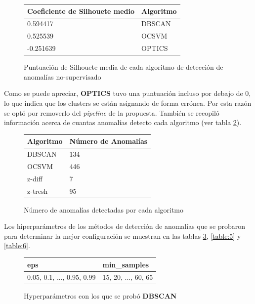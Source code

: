 		\begin{figure}[htb]
			\centering
			\begin{tabular}{ll}
			\toprule
			   Coeficiente de Silhouete medio & Algoritmo \\
			\midrule
			   0.594417 &    DBSCAN \\
			   0.525539 &     OCSVM \\
			  -0.251639 &    OPTICS \\
			\bottomrule
			\end{tabular}
			\caption{Puntuación de Silhouete media de cada algoritmo de detección de anomalías no-supervisado}
			\label{table:2}
		\end{figure}

		Como se puede apreciar, \textbf{OPTICS} tuvo una puntuación incluso por debajo de 0, lo que indica que los clusters se están asignando de 
		forma errónea. Por esta razón se optó por removerlo del \emph{pipeline} de la propuesta. También se recopiló información acerca de cuantas 
		anomalías detecto cada algoritmo (ver tabla \ref{table:3}).
    
		\begin{figure}[htb]
			\centering
			\begin{tabular}{ll}
				\toprule
				Algoritmo &  Número de Anomalías \\
				\midrule
				    DBSCAN &                  134 \\
				     OCSVM &                  446 \\
				    z-diff &                    7 \\
				   z-tresh &                   95 \\
				\bottomrule
			\end{tabular}
			\caption{Número de anomalías detectadas por cada algoritmo}
			\label{table:3}
		\end{figure}

		Los hiperparámetros de los métodos de detección de anomalías que se probaron para determinar la mejor configuración se muestran en las tablas 
		\ref{table:4}, \ref{table:5} y \ref{table:6}.

		\begin{figure}[htb]
			\centering
			\begin{tabular}{ll}
				\toprule
				                                          eps &                                  min\_samples \\
				\midrule
				  0.05, 0.1, ..., 0.95, 0.99 &  15, 20, ..., 60, 65 \\
				\bottomrule
			\end{tabular}
			\caption{Hyperparámetros con los que se probó \textbf{DBSCAN}}
			\label{table:4}
		\end{figure}
		
